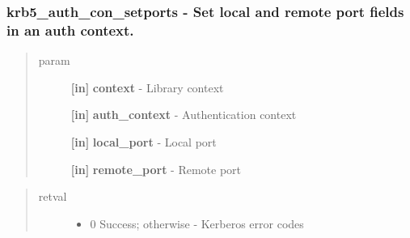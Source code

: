 \documentclass[letterpaper,10pt,english]{sphinxmanual}
\begin{document}
\subsubsection{krb5\_auth\_con\_setports -  Set local and remote port fields in an auth context.}
\label{appdev/refs/api/krb5_auth_con_setports:krb5-auth-con-setports-set-local-and-remote-port-fields-in-an-auth-context}\label{appdev/refs/api/krb5_auth_con_setports::doc}

\begin{fulllineitems}
\label{appdev/refs/api/krb5_auth_con_setports:c.krb5_auth_con_setports}
\end{fulllineitems}

\begin{quote}\begin{description}
\item[{param}] \leavevmode
\textbf{{[}in{]}} \textbf{context} - Library context

\textbf{{[}in{]}} \textbf{auth\_context} - Authentication context

\textbf{{[}in{]}} \textbf{local\_port} - Local port

\textbf{{[}in{]}} \textbf{remote\_port} - Remote port

\end{description}\end{quote}
\begin{quote}\begin{description}
\item[{retval}] \leavevmode\begin{itemize}
\item {} 
0   Success; otherwise - Kerberos error codes

\end{itemize}

\end{description}\end{quote}
\end{document}
